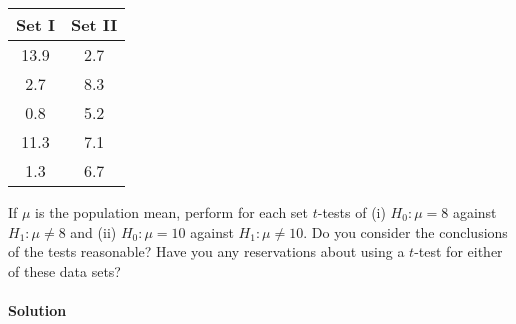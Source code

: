 \documentclass[]{article}
\let\oldparagraph\paragraph
\renewcommand{\paragraph}[1]{\oldparagraph{#1}\mbox{}}
\begin{document}
\begin{longtable}[]{@{}cc@{}}
\toprule
\begin{minipage}[b]{0.10\columnwidth}\centering\strut
Set I\strut
\end{minipage} & \begin{minipage}[b]{0.10\columnwidth}\centering\strut
Set II\strut
\end{minipage}\tabularnewline
\midrule
\endhead
\begin{minipage}[t]{0.10\columnwidth}\centering\strut
13.9\strut
\end{minipage} & \begin{minipage}[t]{0.10\columnwidth}\centering\strut
2.7\strut
\end{minipage}\tabularnewline
\begin{minipage}[t]{0.10\columnwidth}\centering\strut
2.7\strut
\end{minipage} & \begin{minipage}[t]{0.10\columnwidth}\centering\strut
8.3\strut
\end{minipage}\tabularnewline
\begin{minipage}[t]{0.10\columnwidth}\centering\strut
0.8\strut
\end{minipage} & \begin{minipage}[t]{0.10\columnwidth}\centering\strut
5.2\strut
\end{minipage}\tabularnewline
\begin{minipage}[t]{0.10\columnwidth}\centering\strut
11.3\strut
\end{minipage} & \begin{minipage}[t]{0.10\columnwidth}\centering\strut
7.1\strut
\end{minipage}\tabularnewline
\begin{minipage}[t]{0.10\columnwidth}\centering\strut
1.3\strut
\end{minipage} & \begin{minipage}[t]{0.10\columnwidth}\centering\strut
6.7\strut
\end{minipage}\tabularnewline
\bottomrule
\end{longtable}

If \(\mu\) is the population mean, perform for each set \(t\)-tests of
(i) \(H_0: \mu = 8\) against \(H_1: \mu \neq 8\) and (ii)
\(H_0: \mu = 10\) against \(H_1: \mu \neq 10\). Do you consider the
conclusions of the tests reasonable? Have you any reservations about
using a \(t\)-test for either of these data sets?

\paragraph{Solution}\label{solution-6}
\end{document}
